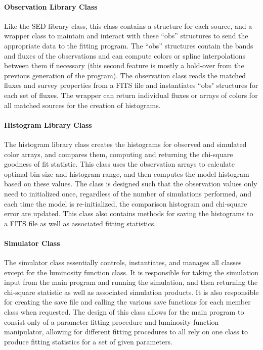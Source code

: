 \documentclass[twocolumn,letterpaper,10pt]{article}
\begin{document}
\paragraph{Observation Library Class}
Like the SED library class, this class contains a structure for each source, and a wrapper class to maintain and interact with these ``obs'' structures to send the appropriate data to the fitting program. The ``obs'' structures contain the bands and fluxes of the observations and can compute colors or spline interpolations between them if necessary (this second feature is mostly a hold-over from the previous generation of the program). The observation class reads the matched fluxes and survey properties from a FITS file and instantiates ``obs" structures for each set of fluxes. The wrapper can return individual fluxes or arrays of colors for all matched sources for the creation of histograms.

\paragraph{Histogram Library Class}
The histogram library class creates the histograms for observed and simulated color arrays, and compares them, computing and returning the chi-square goodness of fit statistic. This class uses the observation arrays to calculate optimal bin size and histogram range, and then computes the model histogram based on these values. The class is designed such that the observation values only need to initialized once, regardless of the number of simulations performed, and each time the model is re-initialized, the comparison histogram and chi-square error are updated. This class also contains methods for saving the histograms to a FITS file as well as associated fitting statistics.

\paragraph{Simulator Class}
The simulator class essentially controls, instantiates, and manages all classes except for the luminosity function class. It is responsible for taking the simulation input from the main program and running the simulation, and then returning the chi-square statistic as well as associated simulation products. It is also responsible for creating the save file and calling the various save functions for each member class when requested. The design of this class allows for the main program to consist only of a parameter fitting procedure and luminosity function manipulator, allowing for different fitting procedures to all rely on one class to produce fitting statistics for a set of given parameters.
\end{document}
